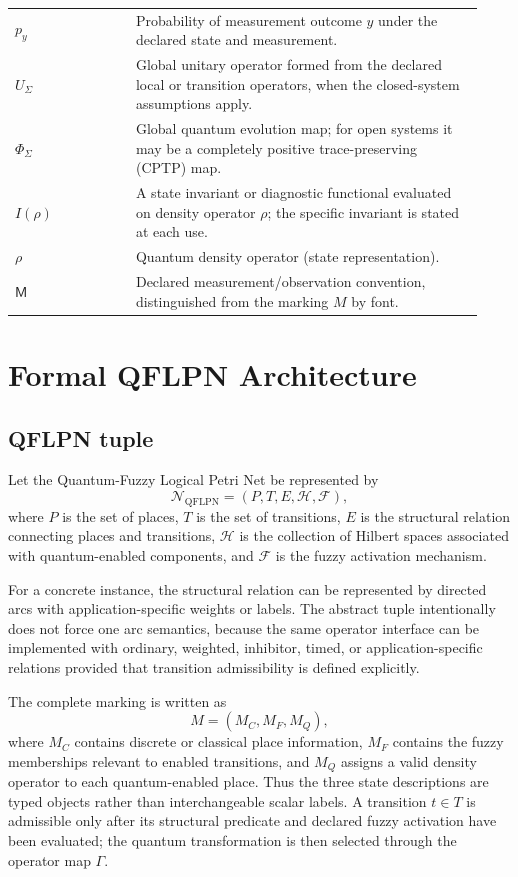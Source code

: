 \documentclass[final,3p,times]{elsarticle}
\newcommand{\QFLPN}{\ensuremath{\mathcal{N}_{\mathrm{QFLPN}}}}
\begin{document}
\begin{longtable}{@{}p{0.24\linewidth}p{0.69\linewidth}@{}}
$p_y$ & Probability of measurement outcome $y$ under the declared state and measurement.\\
$U_{\Sigma}$ & Global unitary operator formed from the declared local or transition operators, when the closed-system assumptions apply.\\
$\Phi_{\Sigma}$ & Global quantum evolution map; for open systems it may be a completely positive trace-preserving (CPTP) map.\\
$I(\rho)$ & A state invariant or diagnostic functional evaluated on density operator $\rho$; the specific invariant is stated at each use.\\
$\rho$ & Quantum density operator (state representation).\\
$\mathsf{M}$ & Declared measurement/observation convention, distinguished from the marking $M$ by font.\\
\bottomrule
\end{longtable}

\section{Formal QFLPN Architecture}

\subsection{QFLPN tuple}

Let the Quantum-Fuzzy Logical Petri Net be represented by
\begin{equation}
    \QFLPN=(P,T,E,\mathcal{H},\mathcal{F}),
\end{equation}
where $P$ is the set of places, $T$ is the set of transitions, $E$ is the structural relation connecting places and transitions, $\mathcal{H}$ is the collection of Hilbert spaces associated with quantum-enabled components, and $\mathcal{F}$ is the fuzzy activation mechanism.

For a concrete instance, the structural relation can be represented by directed arcs with application-specific weights or labels. The abstract tuple intentionally does not force one arc semantics, because the same operator interface can be implemented with ordinary, weighted, inhibitor, timed, or application-specific relations provided that transition admissibility is defined explicitly.

The complete marking is written as
\begin{equation}
    M=(M_C,M_F,M_Q),
\end{equation}
where $M_C$ contains discrete or classical place information, $M_F$ contains the fuzzy memberships relevant to enabled transitions, and $M_Q$ assigns a valid density operator to each quantum-enabled place. Thus the three state descriptions are typed objects rather than interchangeable scalar labels. A transition $t\in T$ is admissible only after its structural predicate and declared fuzzy activation have been evaluated; the quantum transformation is then selected through the operator map $\Gamma$.
\end{document}
